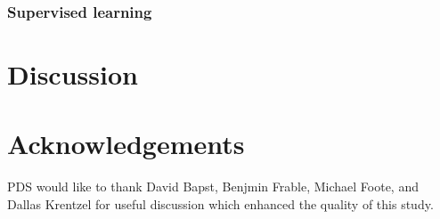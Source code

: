 \documentclass[12pt]{article}\usepackage{graphicx, color}
\begin{document}
\subsubsection{Supervised learning}


\section{Discussion}


\section*{Acknowledgements}
PDS would like to thank David Bapst, Benjmin Frable, Michael Foote, and Dallas Krentzel for useful discussion which enhanced the quality of this study.



\end{document}
